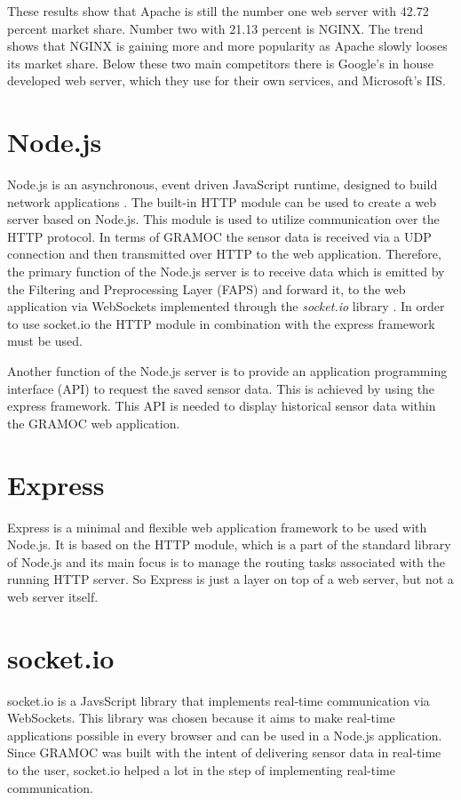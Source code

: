 These results show that Apache is still the number one web server with 42.72 percent market share. Number two with 21.13 percent is NGINX. The trend shows that NGINX is gaining more and more popularity as Apache slowly looses its market share. Below these two main competitors there is Google's in house developed web server, which they use for their own services, and Microsoft's IIS.

\section{Node.js}
\label{sec:nodejs}
Node.js is an asynchronous, event driven JavaScript runtime, designed to build network applications \autocite{Node}. The built-in HTTP module can be used to create a web server based on Node.js. This module is used to utilize communication over the HTTP protocol. In terms of GRAMOC the sensor data is received via a UDP connection and then transmitted over HTTP to the web application. Therefore, the primary function of the Node.js server is to receive data which is emitted by the Filtering and Preprocessing Layer (FAPS) and forward it, to the web application via WebSockets implemented through the \textit{socket.io} library \autocite{socketio}. In order to use socket.io the HTTP module in combination with the express framework must be used.

Another function of the Node.js server is to provide an application programming interface (API) to request the saved sensor data. This is achieved by using the express framework. This API is needed to display historical sensor data within the GRAMOC web application.

\section{Express}
Express is a minimal and flexible web application framework to be used with Node.js. It is based on the HTTP module, which is a part of the standard library of Node.js and its main focus is to manage the routing tasks associated with the running HTTP server. So Express is just a layer on top of a web server, but not a web server itself.

\section{socket.io}
\label{sec:socketio}
socket.io is a JavsScript library that implements real-time communication via WebSockets. This library was chosen because it aims to make real-time applications possible in every browser and can be used in a Node.js application. Since GRAMOC was built with the intent of delivering sensor data in real-time to the user, socket.io helped a lot in the step of implementing real-time communication.

